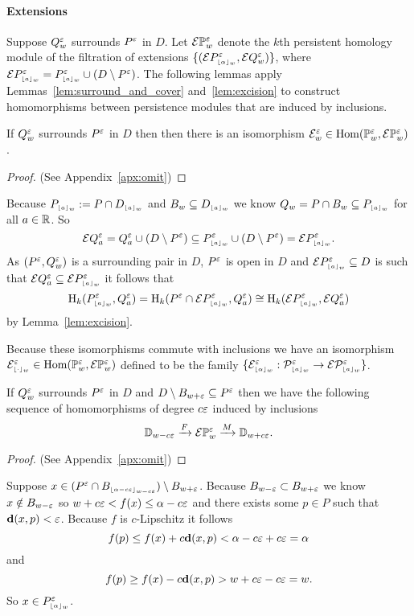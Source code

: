 
\paragraph{Extensions}

Suppose $Q_w^\e$ surrounds $P^\e$ in $D$.
Let $\ext{\PP{w}{\e}}$ denote the $k$th persistent homology module of the filtration of extensions $\{(\ext{P\subi{w}{\alpha}^\e},\ext{Q_w^\e})\}$, where $\ext{P\subi{w}{a}^\e} = P\subi{w}{a}^\e \cup (D\setminus P^\e)$.
The following lemmas apply Lemmas~\ref{lem:surround_and_cover} and~\ref{lem:excision} to construct homomorphisms between persistence modules that are induced by inclusions.

\begin{lemma}\label{lem:extension_apply}
  If $Q_w^\e$ surrounds $P^\e$ in $D$ then then there is an isomorphism $\E_w^\e \in \Hom(\PP{w}{\e},\ext{\PP{w}{\e}})$.
\end{lemma}\begin{proof}
  (See Appendix~\ref{apx:omit})
\end{proof}
\proofatend
  Because $P\subi{w}{a} := P\cap D\subi{w}{a}$ and $B_w\subseteq D\subi{w}{a}$ we know $Q_w = P\cap B_w \subseteq P\subi{w}{a}$ for all $a\in\R$.
  So
  \[\ext{Q^\e_a} = Q^\e_a\cup (D\setminus P^\e) \subseteq P\subi{w}{a}^\e \cup (D\setminus P^\e) = \ext{P\subi{w}{a}^\e}.\]
  As $(P^\e, Q_w^\e)$ is a surrounding pair in $D$, $P^\e$ is open in $D$ and $\ext{P\subi{w}{a}^\e}\subseteq D$ is such that $\ext{Q^\e_a}\subseteq \ext{P\subi{w}{a}^\e}$ it follows that
  \[\hom_k(P\subi{w}{a}^\e, Q^\e_a) = \hom_k(P^\e\cap \ext{P\subi{w}{a}^\e}, Q^\e_a) \cong\hom_k(\ext{P\subi{w}{a}^\e}, \ext{Q^\e_a})\]
  by Lemma~\ref{lem:excision}.

  Because these isomorphisms commute with inclusions we have an isomorphism $\E\subi{w}{\cdot}^\e \in \Hom(\PP{w}{\e},\ext{\PP{w}{\e}})$ defined to be the family $\{\E\subi{w}{\alpha}^\e : \P{w}{\e}{a}\to \E\P{w}{\e}{a}\}$.
\endproofatend

\begin{lemma}\label{lem:p_interleave}
 If $Q_w^\e$ surrounds $P^\e$ in $D$ and $D\setminus B_{w + \e}\subseteq P^\e$ then we have the following sequence of homomorphisms of degree $c\e$ induced by inclusions
 \[\DD{w-c\e}\xrightarrow{F}\E\PP{w}{\e}\xrightarrow{M}\DD{w+c\e}.\]
\end{lemma}
\begin{proof}
  (See Appendix~\ref{apx:omit})
\end{proof}
\proofatend
  Suppose $x\in (P^\e\cap B\subi{w-c\e}{\alpha-c\e})\setminus B_{w+\e}$.
  Because $B_{w-\e}\subset B_{w+\e}$ we know $x\notin B_{w-\e}$ so $w+c\e < f(x)\leq \alpha-c\e$ and there exists some $p\in P$ such that $\dist(x, p) < \e$.
  Because $f$ is $c$-Lipschitz it follows
  \[ f(p)\leq f(x) + c\dist(x, p) < \alpha - c\e + c\e = \alpha\]
  and
  \[ f(p)\geq f(x) - c\dist(x, p) > w+c\e-c\e = w.\]
  So $x\in P\subi{w}{\alpha}^\e$.

